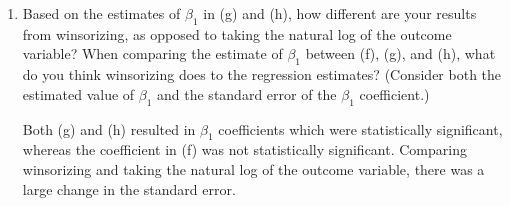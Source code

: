 \documentclass[11pt,twoside,openany]{memoir}
\begin{document}
\begin{question}
\begin{enumerate}[label = (\alph*),itemsep=1pt,topsep=3pt]
        \item Based on the estimates of $\beta_1$ in (g) and (h), how different are your results from winsorizing, as opposed to taking the natural log of the outcome variable? When comparing the estimate of $\beta_1$ between (f), (g), and (h), what do you think winsorizing does to the regression estimates? (Consider both the estimated value of $\beta_1$ and the standard error of the $\beta_1$ coefficient.)
            {\color{blue} \begin{solution}
                Both (g) and (h) resulted in $\beta_1$ coefficients which were statistically significant, whereas the coefficient in (f) was not statistically significant. Comparing winsorizing and taking the natural log of the outcome variable, there was a large change in the standard error.
            \end{solution}}
    \end{enumerate}
\end{question}
\end{document}
